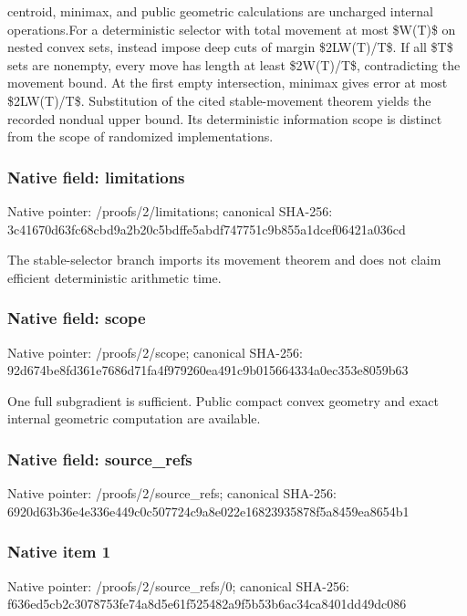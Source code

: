 \documentclass[10pt,a4paper]{article}
\begin{document}
centroid,\allowbreak{} minimax,\allowbreak{} and public geometric calculations are uncharged internal operations.\newline{}\newline{}For a deterministic selector with total movement at most \$W(T)\$ on nested convex sets,\allowbreak{} instead impose deep cuts of margin \$2LW(T)/\allowbreak{}T\$. If all \$T\$ sets are nonempty,\allowbreak{} every move has length at least \$2W(T)/\allowbreak{}T\$,\allowbreak{} contradicting the movement bound. At the first empty intersection,\allowbreak{} minimax gives error at most \$2LW(T)/\allowbreak{}T\$. Substitution of the cited stable-movement theorem yields the recorded nondual upper bound. Its deterministic information scope is distinct from the scope of randomized implementations.\par\endgroup

\subsubsection{Native field: limitations}
Native pointer: /proofs/2/limitations; canonical SHA-256: 3c41670d63fc68cbd9a2b20c5bdffe5abdf747751c9b855a1dcef06421a036cd

\begingroup\raggedright\sloppy The stable-selector branch imports its movement theorem and does not claim efficient deterministic arithmetic time.\par\endgroup

\subsubsection{Native field: scope}
Native pointer: /proofs/2/scope; canonical SHA-256: 92d674be8fd361e7686d71fa4f979260ea491c9b015664334a0ec353e8059b63

\begingroup\raggedright\sloppy One full subgradient is sufficient. Public compact convex geometry and exact internal geometric computation are available.\par\endgroup

\subsubsection{Native field: source\_\allowbreak{}refs}
Native pointer: /proofs/2/source\_\allowbreak{}refs; canonical SHA-256: 6920d63b36e4e336e449c0c507724c9a8e022e16823935878f5a8459ea8654b1

\subsubsection{Native item 1}
Native pointer: /proofs/2/source\_\allowbreak{}refs/0; canonical SHA-256: f636ed5cb2c3078753fe74a8d5e61f525482a9f5b53b6ac34ca8401dd49dc086
\end{document}
